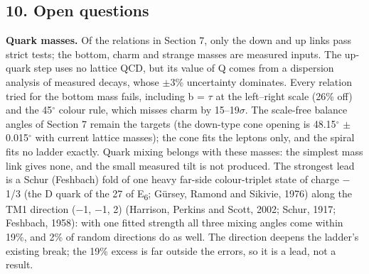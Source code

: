 \documentclass[
  11pt,
]{article}
\newcounter{none} %
\begin{document}
\hypertarget{open-questions}{%
\subsection{10. Open questions}\label{open-questions}}

\textbf{Quark masses.} Of the relations in Section 7, only the down and up links pass strict tests; the bottom, charm and strange masses are measured inputs. The up-quark step uses no lattice QCD, but its value of Q comes from a dispersion analysis of measured decays, whose \ensuremath{\pm}3\% uncertainty dominates. Every relation tried for the bottom mass fails, including b = \ensuremath{\tau} at the left--right scale (26\% off) and the 45\ensuremath{^\circ} colour rule, which misses charm by 15--19\ensuremath{\sigma}. The scale-free balance angles of Section 7 remain the targets (the down-type cone opening is 48.15\ensuremath{^\circ} \ensuremath{\pm} 0.015\ensuremath{^\circ} with current lattice masses); the cone fits the leptons only, and the spiral fits no ladder exactly. Quark mixing belongs with these masses: the simplest mass link gives none, and the small measured tilt is not produced. The strongest lead is a Schur (Feshbach) fold of one heavy far-side colour-triplet state of charge \ensuremath{-}1/3 (the D quark of the 27 of E\textsubscript{6}; Gürsey, Ramond and Sikivie, 1976) along the TM1 direction (\ensuremath{-}1, \ensuremath{-}1, 2) (Harrison, Perkins and Scott, 2002; Schur, 1917; Feshbach, 1958): with one fitted strength all three mixing angles come within 19\%, and 2\% of random directions do as well. The direction deepens the ladder's existing break; the 19\% excess is far outside the errors, so it is a lead, not a result.
\end{document}

